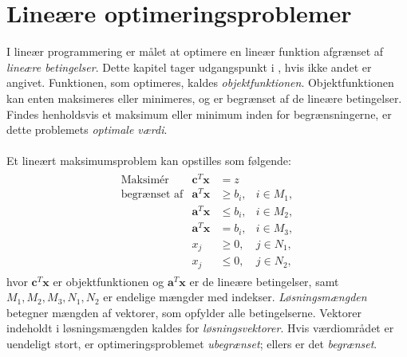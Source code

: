 \chapter{Lineære optimeringsproblemer}
%
I lineær programmering er målet at optimere en lineær funktion afgrænset af \textit{lineære betingelser}.
Dette kapitel tager udgangspunkt i \citep[side 2-6, 21-24 og 139-146]{bert}, hvis ikke andet er angivet.
Funktionen, som optimeres, kaldes \textit{objektfunktionen}.
Objektfunktionen kan enten maksimeres eller minimeres, og er begrænset af de lineære betingelser.
Findes henholdsvis et maksimum eller minimum inden for begrænsningerne, er dette problemets \textit{optimale værdi}.
\\\\
%
Et lineært maksimumsproblem kan opstilles som følgende:
%
\begin{align*}
\begin{array}{lrll}
\text{Maksimér}		&\textbf{c}^T\textbf{x}	& = z		&\\
\text{begrænset af}	&\textbf{a}^T\textbf{x}	&\geq b_i,	&i \in M_1,\\
					&\textbf{a}^T\textbf{x}	&\leq b_i,	&i \in M_2,\\
					&\textbf{a}^T\textbf{x}	& = b_i,	&i \in M_3,\\
					&x_j					&\geq 0,	&j \in N_1,\\
					&x_j					&\leq 0,	&j \in N_2,
\end{array}
\end{align*}
%
hvor $\textbf{c}^T\textbf{x}$ er objektfunktionen og $\textbf{a}^T\textbf{x}$ er de lineære betingelser, samt $M_1, M_2, M_3, N_1, N_2$ er endelige mængder med indekser.
\textit{Løsningsmængden} betegner mængden af vektorer, som opfylder alle betingelserne.
Vektorer indeholdt i løsningsmængden kaldes for \textit{løsningsvektorer}.
Hvis værdiområdet er uendeligt stort, er optimeringsproblemet \textit{ubegrænset}; ellers er det \textit{begrænset}. 
\\\\
%
